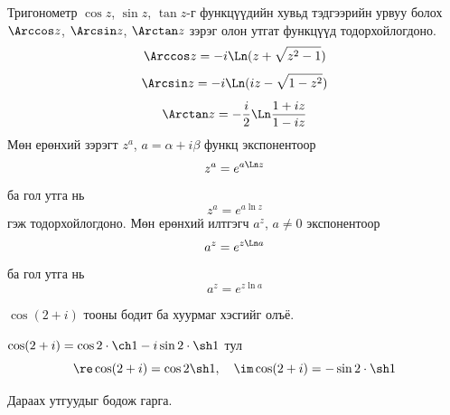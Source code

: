 Тригонометр $\cos  z$, $\sin z$, $\tan z$-г функцүүдийн  хувьд тэдгээрийн урвуу болох $\Arccos z$, $\Arcsin z$, $\Arctan z$ зэрэг олон утгат функцүүд тодорхойлогдоно.
\begin{equation}
\Arccos z= -i \Ln (z+\sqrt{z^2-1}) 
\end{equation}
\begin{equation}
\Arcsin z= -i \Ln (iz-\sqrt{1-z^2}) 
\end{equation}
\begin{equation}
\Arctan z= -\dfrac{i}{2}\Ln \dfrac{1+iz}{1-iz}
\end{equation}
Мөн ерөнхий зэрэгт $z^a$, $a=\alpha +i\beta$  функц экспонентоор
\begin{equation}
z^a=e^{a\Ln z}
\end{equation}
ба гол утга нь
\begin{equation}
z^a=e^{a\ln z}
\end{equation}
гэж тодорхойлогдоно. Мөн ерөнхий илтгэгч $a^z$, $a\neq 0$ экспонентоор
\begin{equation}
a^z=e^{z\Ln a}
\end{equation}
ба гол утга нь
\begin{equation}
a^z=e^{z\ln a}
\end{equation}
\begin{exm}
$\cos (2+i)$ тооны бодит ба хуурмаг хэсгийг олъё.
\end{exm}
\begin{sol}
$\cos (2+i)=\cos 2\cdot \ch 1-i \sin 2\cdot \sh1$ тул $$\re \cos (2+i)=\cos 2 \sh1, \quad \im \cos (2+i)=-\sin 2\cdot \sh1$$
\end{sol}
\begin{exm}
Дараах утгуудыг бодож гарга.

\begin{enumerate}
    \end{enumerate}
\end{exm}
